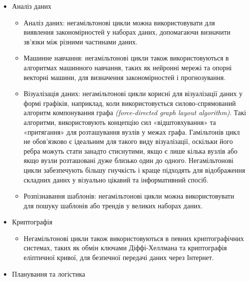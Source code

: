 \documentclass[14pt]{article}
\begin{document}
\begin{spacing}{1.175}
\begin{itemize}
        \item Аналіз даних
        \begin{itemize}
            
            \item Аналіз даних: негамільтонові цикли можна використовувати для виявлення закономірностей у наборах даних, допомагаючи визначити зв’язки між різними частинами даних.
            
            \item Машинне навчання: негамільтонові цикли також використовуються в алгоритмах машинного навчання, таких як нейронні мережі та опорні векторні машини, для визначення закономірностей і прогнозування.
                
            \item Візуалізація даних: негамільтонові цикли корисні для візуалізації даних у формі графіків, наприклад, коли використовується силово-спрямований алгоритм компонування графа \textit{(force-directed graph layout algorithm)}. Такі алгоритми, використовують концепцію сил «відштовхування» та «притягання» для розташування вузлів у межах графа. Гамільтонів цикл не обов’язково є ідеальним для такого виду візуалізації, оскільки його ребра можуть стати занадто стиснутими, якщо є лише кілька вузлів або якщо вузли розташовані дуже близько один до одного. Негамільтонові цикли забезпечують більшу гнучкість і краще підходять для відображення складних даних у візуально цікавий та інформативний спосіб.

            \item Розпізнавання шаблонів: негамільтонові цикли можна використовувати для пошуку шаблонів або трендів у великих наборах даних.
        
        \end{itemize}


        \item Криптографія
        \begin{itemize}
             
             \item Негамільтонові цикли також використовуються в певних криптографічних системах, таких як обмін ключами Діффі-Хеллмана та криптографія еліптичної кривої, для безпечної передачі даних через Інтернет.
        
        \end{itemize}


        \item Планування та логістика
        \begin{itemize}
            

\end{itemize}
\end{itemize}
\end{spacing}
\end{document}
